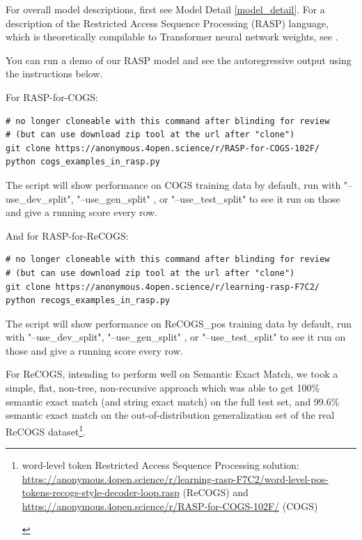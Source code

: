 \documentclass[11pt]{article}
\begin{document}
For overall model descriptions, first see Model Detail \ref{model_detail}.
For a description of the Restricted Access Sequence Processing (RASP) language, which is theoretically compilable to Transformer neural network weights, see \cite{Weiss2021}.

You can run a demo of our RASP model and see the autoregressive output using the instructions below.

For RASP-for-COGS:
\begin{tiny}
\begin{verbatim}
# no longer cloneable with this command after blinding for review
# (but can use download zip tool at the url after "clone")
git clone https://anonymous.4open.science/r/RASP-for-COGS-102F/
python cogs_examples_in_rasp.py
\end{verbatim}
\end{tiny}

The script will show performance on COGS training data by default, run with "--use\_dev\_split", "--use\_gen\_split" , or "--use\_test\_split" to see it run on those and give a running score every row.

And for RASP-for-ReCOGS:
\begin{tiny}
\begin{verbatim}
# no longer cloneable with this command after blinding for review
# (but can use download zip tool at the url after "clone")
git clone https://anonymous.4open.science/r/learning-rasp-F7C2/
python recogs_examples_in_rasp.py 
\end{verbatim}
\end{tiny}

The script will show performance on \cite{Wu2023} ReCOGS\_pos training data by default, run with "--use\_dev\_split", "--use\_gen\_split" , or "--use\_test\_split" to see it run on those and give a running score every row.

For ReCOGS, intending to perform well on Semantic Exact Match, we took a simple, flat, non-tree, non-recursive approach which was able to get 100\% semantic exact match (and string exact match) on the full test set, and 99.6\% semantic exact match on the out-of-distribution generalization set of the real ReCOGS dataset\footnote{\begin{footnotesize}word-level token Restricted Access Sequence Processing solution: \href{https://anonymous.4open.science/r/learning-rasp-F7C2/word-level-pos-tokens-recogs-style-decoder-loop.rasp}{https://anonymous.4open.science/r/learning-rasp-F7C2/word-level-pos-tokens-recogs-style-decoder-loop.rasp} (ReCOGS) and \href{https://anonymous.4open.science/r/RASP-for-COGS-102F/}{https://anonymous.4open.science/r/RASP-for-COGS-102F/} (COGS)\end{footnotesize}}.
\end{document}
